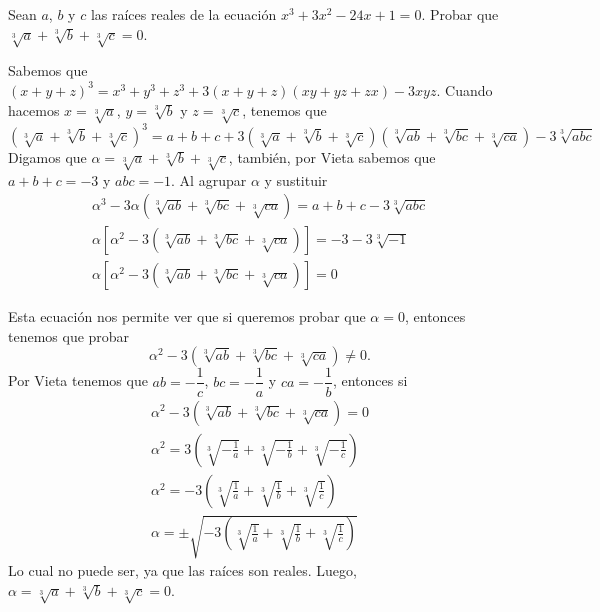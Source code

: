 \begin{section-problem}
    Sean $a$, $b$ y $c$ las raíces reales de la ecuación $x^3 + 3x^2 - 24x + 1 = 0$.
    Probar que $\sqrt[3]{a} + \sqrt[3]{b} + \sqrt[3]{c} = 0$.

    \begin{solution}
        Sabemos que $(x + y + z)^3 = x^3 + y^3 + z^3 + 3(x + y + z)(xy + yz + zx) - 3xyz$.
        Cuando hacemos $x = \sqrt[3]{a}$, $y = \sqrt[3]{b}$ y $z = \sqrt[3]{c}$, tenemos que
        \[\left(\sqrt[3]{a} + \sqrt[3]{b} + \sqrt[3]{c}\right)^3 = a + b + c + 3\left(\sqrt[3]{a} + \sqrt[3]{b} + \sqrt[3]{c}\right)\left(\sqrt[3]{ab} + \sqrt[3]{bc} + \sqrt[3]{ca}\right) - 3\sqrt[3]{abc}\]
        Digamos que $\alpha = \sqrt[3]{a} + \sqrt[3]{b} + \sqrt[3]{c}$, también, por Vieta sabemos que $a + b + c = -3$ y $abc = -1$.
        Al agrupar $\alpha$ y sustituir
        \begin{gather*}
            \alpha^3 - 3\alpha\left(\sqrt[3]{ab} + \sqrt[3]{bc} + \sqrt[3]{ca}\right)= a + b + c - 3\sqrt[3]{abc}\\
            \alpha\left[ \alpha^2 - 3\left(\sqrt[3]{ab} + \sqrt[3]{bc} + \sqrt[3]{ca}\right) \right]= -3 - 3\sqrt[3]{-1}\\
            \alpha\left[ \alpha^2 - 3\left(\sqrt[3]{ab} + \sqrt[3]{bc} + \sqrt[3]{ca}\right) \right]= 0
        \end{gather*}

        Esta ecuación nos permite ver que si queremos probar que $\alpha = 0$, entonces tenemos que probar
        \[\alpha^2 - 3\left(\sqrt[3]{ab} + \sqrt[3]{bc} + \sqrt[3]{ca}\right) \neq 0.\]
        Por Vieta tenemos que $ab = -\dfrac{1}{c}$, $bc = -\dfrac{1}{a}$ y $ca = -\dfrac{1}{b}$, entonces si
        \begin{gather*}
            \alpha^2 - 3\left(\sqrt[3]{ab} + \sqrt[3]{bc} + \sqrt[3]{ca}\right) = 0\\
            \alpha^2 = 3\left(\sqrt[3]{-\frac{1}{a}} + \sqrt[3]{-\frac{1}{b}} + \sqrt[3]{-\frac{1}{c}}\right) \\
            \alpha^2 = - 3\left(\sqrt[3]{\frac{1}{a}} + \sqrt[3]{\frac{1}{b}} + \sqrt[3]{\frac{1}{c}}\right) \\
            \alpha = \pm \sqrt{ - 3\left(\sqrt[3]{\frac{1}{a}} + \sqrt[3]{\frac{1}{b}} + \sqrt[3]{\frac{1}{c}}\right)}
        \end{gather*}
        Lo cual no puede ser, ya que las raíces son reales.
        Luego, $\alpha = \boxed{\sqrt[3]{a} + \sqrt[3]{b} + \sqrt[3]{c} = 0}$.
    \end{solution}
\end{section-problem}

